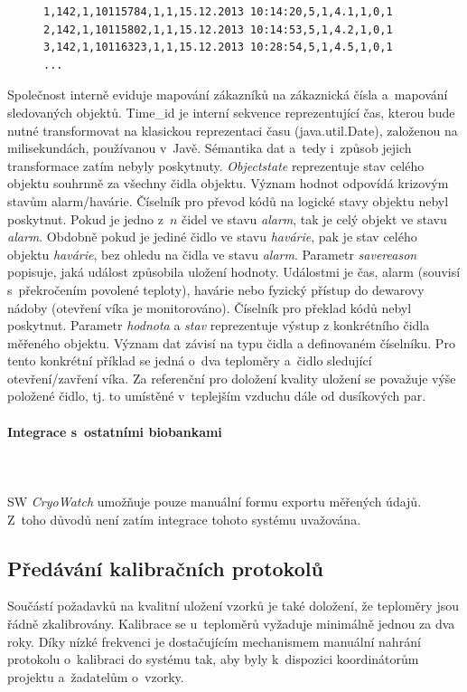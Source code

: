 \documentclass[11pt,draft,oneside]{fithesis2}
\newcommand{\paragraphNewLine}[1]{\paragraph*{#1}\mbox{}\\}
\begin{document}

\begin{figure}[h!]
\centering
\begin{BVerbatim}
1,142,1,10115784,1,1,15.12.2013 10:14:20,5,1,4.1,1,0,1
2,142,1,10115802,1,1,15.12.2013 10:14:53,5,1,4.2,1,0,1
3,142,1,10116323,1,1,15.12.2013 10:28:54,5,1,4.5,1,0,1
...
\end{BVerbatim}
\end{figure}

Společnost interně eviduje mapování zákazníků na zákaznická čísla a~mapování sledovaných objektů. 
Time\_id je interní sekvence reprezentující čas, kterou bude nutné transformovat na klasickou reprezentaci času (java.util.Date), založenou na milisekundách, používanou v~Javě. Sémantika dat a~tedy i~způsob jejich transformace zatím nebyly poskytnuty.
\textit{Objectstate} reprezentuje stav celého objektu souhrnně za všechny čidla objektu. Význam hodnot odpovídá krizovým stavům alarm/havárie. Číselník pro převod kódů na logické stavy objektu nebyl poskytnut. Pokud je jedno z~$n$ čidel ve stavu \textit{alarm}, tak je celý objekt ve stavu \textit{alarm}. Obdobně pokud je jediné čidlo ve stavu \textit{havárie}, pak je stav celého objektu \textit{havárie}, bez ohledu na čidla ve stavu \textit{alarm}.
Parametr \textit{savereason} popisuje, jaká událost způsobila uložení hodnoty. Událostmi je čas, alarm (souvisí s~překročením povolené teploty), havárie nebo fyzický přístup do dewarovy nádoby (otevření víka je monitorováno). Číselník pro překlad kódů nebyl poskytnut. Parametr \textit{hodnota} a \textit{stav} reprezentuje výstup z konkrétního čidla měřeného objektu. Význam dat závisí na typu čidla a definovaném číselníku. Pro tento konkrétní příklad se jedná o~dva teploměry a~čidlo sledující otevření/zavření víka.
Za referenční pro doložení kvality uložení se považuje výše položené čidlo, tj. to umístěné v~teplejším vzduchu dále od dusíkových par. 

\paragraphNewLine{Integrace s~ostatními biobankami}\mbox{}\\
SW \textit{CryoWatch} umožňuje pouze manuální formu exportu měřených údajů. Z~toho důvodů není zatím integrace tohoto systému uvažována. 

\subsection{Předávání kalibračních protokolů}
Součástí požadavků na kvalitní uložení vzorků je také doložení, že teploměry jsou řádně zkalibrovány. Kalibrace se u~teploměrů vyžaduje minimálně jednou za dva roky. Díky nízké frekvenci je dostačujícím mechanismem manuální nahrání protokolu o~kalibraci do systému tak, aby byly k~dispozici koordinátorům projektu a~žadatelům o~vzorky.
\end{document}

